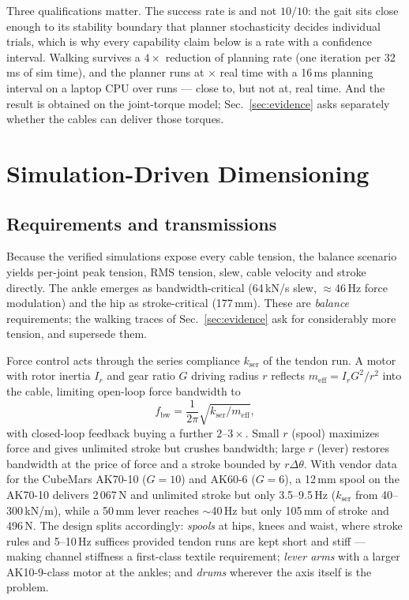 \documentclass[conference]{IEEEtran}
\begin{document}
Three qualifications matter. The success rate is \walkRate{} and not $10/10$:
the gait sits close enough to its stability boundary that planner
stochasticity decides individual trials, which is why every capability claim
below is a rate with a confidence interval. Walking survives a $4\times$
reduction of planning rate (one iteration per 32\,ms of sim time), and the
planner runs at \realtimeFactor$\times$ real time with a 16\,ms planning
interval on a laptop CPU over \realtimeN{} runs --- close to, but not at, real
time. And the result is obtained on the joint-torque model;
Sec.~\ref{sec:evidence} asks separately whether the cables can deliver those
torques.

\section{Simulation-Driven Dimensioning}
\label{sec:codesign}

\subsection{Requirements and transmissions}
Because the verified simulations expose every cable tension, the balance
scenario yields per-joint peak tension, RMS tension, slew, cable velocity and
stroke directly. The ankle emerges as bandwidth-critical (64\,kN/s slew,
$\approx$46\,Hz force modulation) and the hip as stroke-critical (177\,mm).
These are \emph{balance} requirements; the walking traces of
Sec.~\ref{sec:evidence} ask for considerably more tension, and supersede them.

Force control acts through the series compliance $k_{\mathrm{ser}}$ of the
tendon run. A motor with rotor inertia $I_r$ and gear ratio $G$ driving radius
$r$ reflects $m_{\mathrm{eff}}=I_rG^2/r^2$ into the cable, limiting open-loop
force bandwidth to
\begin{equation}
  f_{\mathrm{bw}} = \frac{1}{2\pi}\sqrt{k_{\mathrm{ser}}/m_{\mathrm{eff}}},
  \label{eq:bandwidth}
\end{equation}
with closed-loop feedback buying a further $2$--$3\times$. Small $r$ (spool)
maximizes force and gives unlimited stroke but crushes bandwidth; large $r$
(lever) restores bandwidth at the price of force and a stroke bounded by
$r\Delta\theta$. With vendor data for the CubeMars AK70-10 ($G{=}10$) and
AK60-6 ($G{=}6$), a 12\,mm spool on the AK70-10 delivers 2\,067\,N and
unlimited stroke but only 3.5--9.5\,Hz ($k_{\mathrm{ser}}$ from
40--300\,kN/m), while a 50\,mm lever reaches $\sim$40\,Hz but only 105\,mm of
stroke and 496\,N. The design splits accordingly: \emph{spools} at hips, knees
and waist, where stroke rules and 5--10\,Hz suffices provided tendon runs are
kept short and stiff --- making channel stiffness a first-class textile
requirement; \emph{lever arms} with a larger AK10-9-class motor at the ankles;
and \emph{drums} wherever the axis itself is the problem.
\end{document}
